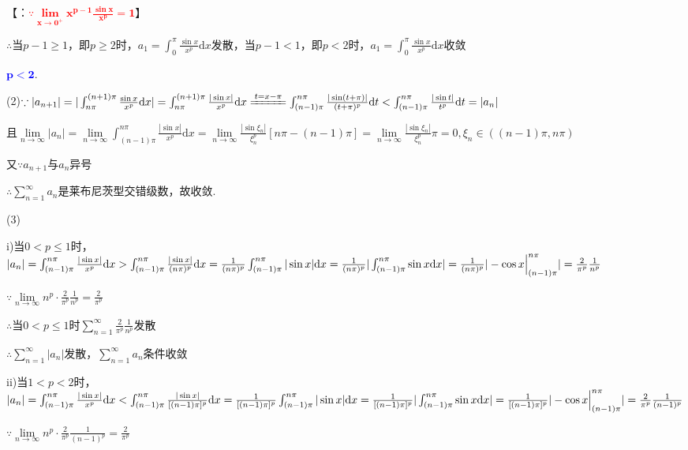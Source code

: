 \documentclass[12pt,UTF8]{ctexart}
\begin{document}
\begin{enumerate}
【{：}\textcolor{red}{$\bm{\because\lim\limits_{x\rightarrow0^+}x^{p-1}\frac{\sin x}{x^p}=1}$}】

$\therefore$当$p-1\geq1$，即$p\geq2$时，$a_1=\int_0^\pi\frac{\sin x}{x^p}\mathrm dx$发散，当$p-1<1$，即$p<2$时，$a_1=\int_0^\pi\frac{\sin x}{x^p}\mathrm dx$收敛

\textcolor{blue}{$\bm{p<2}$}.

(2)$\because|a_{n+1}|=|\int_{n\pi}^{(n+1)\pi}\frac{\sin x}{x^p}\mathrm dx|=\int_{n\pi}^{(n+1)\pi}\frac{|\sin x|}{x^p}\mathrm dx\xlongequal{t=x-\pi}\int_{(n-1)\pi}^{n\pi}\frac{|\sin(t+\pi)|}{(t+\pi)^p}\mathrm dt\\
<\int_{(n-1)\pi}^{n\pi}\frac{|\sin t|}{t^p}\mathrm dt=|a_n|$

且$\lim\limits_{n\rightarrow\infty}|a_n|=\lim\limits_{n\rightarrow\infty}\int_{(n-1)\pi}^{n\pi}\frac{|\sin x|}{x^{p}}\mathrm dx=\lim\limits_{n\rightarrow\infty}\frac{|\sin\xi_n|}{\xi_n^p}[n\pi-(n-1)\pi]=\lim\limits_{n\rightarrow\infty}\frac{|\sin\xi_n|}{\xi_n^p}\pi=0,\xi_n\in((n-1)\pi,n\pi)$

又$\because a_{n+1}$与$a_n$异号

$\therefore\sum_{n=1}^\infty a_n$是莱布尼茨型交错级数，故收敛.

(3)

i)当$0<p\leq1$时，$|a_n|=\int_{(n-1)\pi}^{n\pi}\frac{|\sin x|}{x^p}\mathrm dx>\int_{(n-1)\pi}^{n\pi}\frac{|\sin x|}{(n\pi)^p}\mathrm dx=\frac1{(n\pi)^p}\int_{(n-1)\pi}^{n\pi}|\sin x|\mathrm dx\\
=\frac1{(n\pi)^p}|\int_{(n-1)\pi}^{n\pi}\sin x\mathrm dx|=\frac1{(n\pi)^p}|-\cos x\Big|_{(n-1)\pi}^{n\pi}|=\frac2{\pi^p}\frac1{n^p}$

$\because\lim\limits_{n\rightarrow\infty}n^p\cdot\frac2{\pi^p}\frac1{n^p}=\frac2{\pi^p}$

$\therefore$当$0<p\leq1$时$\sum_{n=1}^\infty\frac2{\pi^p}\frac1{n^p}$发散

$\therefore\sum_{n=1}^\infty|a_n|$发散，$\sum_{n=1}^\infty a_n$条件收敛

ii)当$1<p<2$时，$|a_n|=\int_{(n-1)\pi}^{n\pi}\frac{|\sin x|}{x^p}\mathrm dx<\int_{(n-1)\pi}^{n\pi}\frac{|\sin x|}{[(n-1)\pi]^p}\mathrm dx=\frac1{[(n-1)\pi]^p}\int_{(n-1)\pi}^{n\pi}|\sin x|\mathrm dx\\
=\frac1{[(n-1)\pi]^p}|\int_{(n-1)\pi}^{n\pi}\sin x\mathrm dx|=\frac1{[(n-1)\pi]^p}|-\cos x\Big|_{(n-1)\pi}^{n\pi}|=\frac2{\pi^p}\frac1{(n-1)^p}$

$\because\lim\limits_{n\rightarrow\infty}n^p\cdot\frac2{\pi^p}\frac1{(n-1)^p}=\frac2{\pi^p}$


\end{enumerate}
\end{document}
